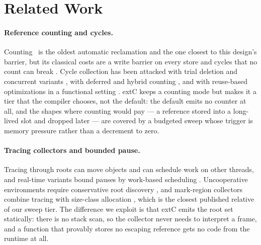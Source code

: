 \section{Related Work}
\label{sec:related}

\paragraph{Reference counting and cycles.}
Counting~\cite{collins1960} is the oldest automatic reclamation and the one closest to this
design's barrier, but its classical costs are a write barrier on every store and cycles that no
count can break \cite{jones2011handbook}. Cycle collection has been attacked with trial deletion
and concurrent variants \cite{bacon2001concurrent}, with deferred and hybrid counting
\cite{blackburn2003ulterior}, and with reuse-based optimizations in a functional setting
\cite{reinking2021perceus}.  extC keeps a counting mode but makes it a tier that the compiler
chooses, not the default: the default emits no counter at all, and the shapes where counting would
pay — a reference stored into a long-lived slot and dropped later — are covered by a budgeted sweep
whose trigger is memory pressure rather than a decrement to zero.

\paragraph{Tracing collectors and bounded pause.}
Tracing through roots \cite{jones2011handbook} can move objects and can schedule work on other
threads, and real-time variants bound pauses by work-based scheduling \cite{bacon2003realtime}.
Uncooperative environments require conservative root discovery \cite{boehm1988uncooperative}, and
mark-region collectors combine tracing with size-class allocation \cite{blackburn2008immix}, which
is the closest published relative of our sweep tier.  The difference we exploit is that extC emits
the root set statically: there is no stack scan, so the collector never needs to interpret a frame,
and a function that provably stores no escaping reference gets no code from the runtime at all.

